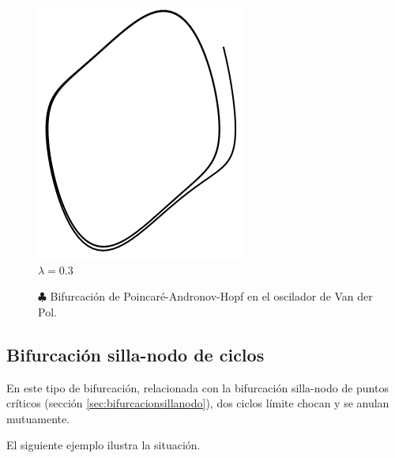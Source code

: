\begin{figure}[!ht]
	\includegraphics[scale=0.35]{figures/vanderpol-hopfbifurcation-0_3.png} \\ $\lambda = 0.3$
	\caption{$\clubsuit$ Bifurcación de Poincaré-Andronov-Hopf en el oscilador de Van der Pol.}
\end{figure}

\subsection{Bifurcación silla-nodo de ciclos}
En este tipo de bifurcación, relacionada con la bifurcación silla-nodo de puntos críticos (sección \ref{sec:bifurcacionsillanodo}), dos ciclos límite chocan y se anulan mutuamente.

El siguiente ejemplo ilustra la situación.

